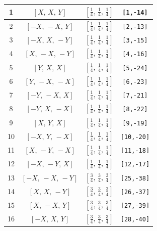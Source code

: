 \documentclass[fleqn,8pt]{jsarticle}
\begin{document}
\begin{longtable}{cccc}
1 & $\left[ X,\, X,\, Y \right]$ & $\left[ \frac{1}{4},\, \frac{1}{4},\, \frac{1}{4} \right]$ & {\tt [1,-14]} \\ \hline
2 & $\left[ - X,\, - X,\, Y \right]$ & $\left[ \frac{1}{4},\, \frac{1}{4},\, \frac{1}{4} \right]$ & {\tt [2,-13]} \\ \hline
3 & $\left[ - X,\, X,\, - Y \right]$ & $\left[ \frac{1}{4},\, \frac{1}{4},\, \frac{1}{4} \right]$ & {\tt [3,-15]} \\ \hline
4 & $\left[ X,\, - X,\, - Y \right]$ & $\left[ \frac{1}{4},\, \frac{1}{4},\, \frac{1}{4} \right]$ & {\tt [4,-16]} \\ \hline
5 & $\left[ Y,\, X,\, X \right]$ & $\left[ \frac{1}{4},\, \frac{1}{4},\, \frac{1}{4} \right]$ & {\tt [5,-24]} \\ \hline
6 & $\left[ Y,\, - X,\, - X \right]$ & $\left[ \frac{1}{4},\, \frac{1}{4},\, \frac{1}{4} \right]$ & {\tt [6,-23]} \\ \hline
7 & $\left[ - Y,\, - X,\, X \right]$ & $\left[ \frac{1}{4},\, \frac{1}{4},\, \frac{1}{4} \right]$ & {\tt [7,-21]} \\ \hline
8 & $\left[ - Y,\, X,\, - X \right]$ & $\left[ \frac{1}{4},\, \frac{1}{4},\, \frac{1}{4} \right]$ & {\tt [8,-22]} \\ \hline
9 & $\left[ X,\, Y,\, X \right]$ & $\left[ \frac{1}{4},\, \frac{1}{4},\, \frac{1}{4} \right]$ & {\tt [9,-19]} \\ \hline
10 & $\left[ - X,\, Y,\, - X \right]$ & $\left[ \frac{1}{4},\, \frac{1}{4},\, \frac{1}{4} \right]$ & {\tt [10,-20]} \\ \hline
11 & $\left[ X,\, - Y,\, - X \right]$ & $\left[ \frac{1}{4},\, \frac{1}{4},\, \frac{1}{4} \right]$ & {\tt [11,-18]} \\ \hline
12 & $\left[ - X,\, - Y,\, X \right]$ & $\left[ \frac{1}{4},\, \frac{1}{4},\, \frac{1}{4} \right]$ & {\tt [12,-17]} \\ \hline
13 & $\left[ - X,\, - X,\, - Y \right]$ & $\left[ \frac{3}{4},\, \frac{3}{4},\, \frac{3}{4} \right]$ & {\tt [25,-38]} \\ \hline
14 & $\left[ X,\, X,\, - Y \right]$ & $\left[ \frac{3}{4},\, \frac{3}{4},\, \frac{3}{4} \right]$ & {\tt [26,-37]} \\ \hline
15 & $\left[ X,\, - X,\, Y \right]$ & $\left[ \frac{3}{4},\, \frac{3}{4},\, \frac{3}{4} \right]$ & {\tt [27,-39]} \\ \hline
16 & $\left[ - X,\, X,\, Y \right]$ & $\left[ \frac{3}{4},\, \frac{3}{4},\, \frac{3}{4} \right]$ & {\tt [28,-40]} \\ \hline

\end{longtable}
\end{document}
